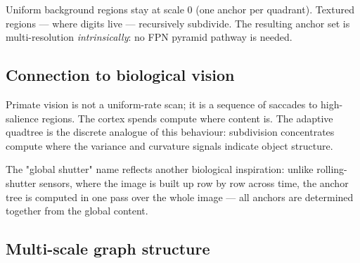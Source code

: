 \documentclass[11pt,a4paper]{article}
\begin{document}
\begin{center}
\end{center}

Uniform background regions stay at scale 0 (one anchor per
quadrant). Textured regions — where digits live — recursively
subdivide. The resulting anchor set is multi-resolution
\emph{intrinsically}: no FPN pyramid pathway is needed.

\subsection{Connection to biological vision}

Primate vision is not a uniform-rate scan; it is a sequence of
saccades to high-salience regions. The cortex spends compute where
content is. The adaptive quadtree is the discrete analogue of this
behaviour: subdivision concentrates compute where the variance and
curvature signals indicate object structure.

The "global shutter" name reflects another biological inspiration:
unlike rolling-shutter sensors, where the image is built up row by
row across time, the anchor tree is computed in one pass over the
whole image — all anchors are determined together from the global
content.

\subsection{Multi-scale graph structure}
\end{document}
